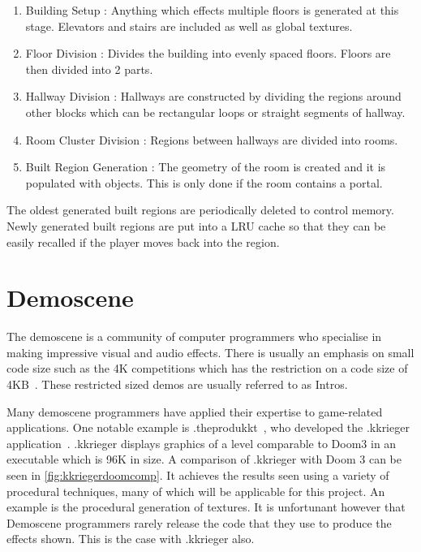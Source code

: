 \documentclass[12pt]{article}
\begin{document}
\begin{enumerate}
	\item Building Setup : Anything which effects multiple floors is generated at this stage. Elevators and stairs are included as well as global textures.
	\item Floor Division : Divides the building into evenly spaced floors. Floors are then divided into 2 parts.
	\item Hallway Division : Hallways are constructed by dividing the regions around other blocks which can be rectangular loops or straight segments of hallway. 
	\item Room Cluster Division : Regions between hallways are divided into rooms. 
	\item Built Region Generation : The geometry of the room is created and it is populated with objects. This is only done if the room contains a portal.
\end{enumerate}

The oldest generated built regions are periodically deleted to control memory. 
Newly generated built regions are put into a LRU cache so that they can be easily recalled if the player moves back into the region.

\section{Demoscene}
The demoscene is a community of computer programmers who specialise in making impressive visual and audio effects.
There is usually an emphasis on small code size such as the 4K competitions which has the restriction on a code size of 4KB~\cite{web:demoscene4k}.
These restricted sized demos are usually referred to as Intros.

Many demoscene programmers have applied their expertise to game-related applications.
One notable example is .theprodukkt~\cite{web:theprodukkt}, who developed the .kkrieger application~\cite{web:kkrieger}.
.kkrieger displays graphics of a level comparable to Doom3 in an executable which is 96K in size.
A comparison of .kkrieger with Doom 3 can be seen in \ref{fig:kkriegerdoomcomp}.
It achieves the results seen using a variety of procedural techniques, many of which will be applicable for this project.
An example is the procedural generation of textures.
It is unfortunant however that Demoscene programmers rarely release the code that they use to produce the effects shown.
This is the case with .kkrieger also.
\end{document}
